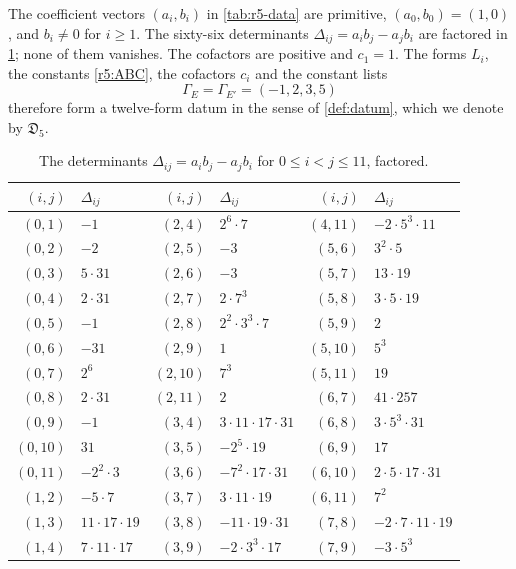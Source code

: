 \documentclass[12pt,oneside,openany]{book}
\theoremstyle{definition}
\theoremstyle{plain}
\numberwithin{equation}{chapter}
\theoremstyle{plain}
\theoremstyle{definition}
\theoremstyle{remark}
\newcommand{\datum}{\mathfrak D}
\begin{document}
The coefficient vectors $(a_i,b_i)$ in \cref{tab:r5-data} are primitive, $(a_0,b_0)=(1,0)$, and $b_i\ne0$ for $i\ge1$. The sixty-six determinants $\Delta_{ij}=a_ib_j-a_jb_i$ are factored in \cref{tab:r5-det}; none of them vanishes. The cofactors are positive and $c_1=1$. The forms $L_i$, the constants \eqref{r5:ABC}, the cofactors $c_i$ and the constant lists
\begin{equation}\label{r5:Gamma}
\Gamma_E=\Gamma_{E'}=(-1,2,3,5)
\end{equation}
therefore form a twelve-form datum in the sense of \cref{def:datum}, which we denote by $\datum_5$.

\begin{table}[htbp]
\centering
\caption{The determinants $\Delta_{ij}=a_ib_j-a_jb_i$ for $0\le i<j\le 11$, factored.}\label{tab:r5-det}
\small
\begin{tabular}{rl@{\qquad}rl@{\qquad}rl}
\toprule
$(i,j)$ & $\Delta_{ij}$ & $(i,j)$ & $\Delta_{ij}$ & $(i,j)$ & $\Delta_{ij}$\\
\midrule
$(0,1)$ & $-1$ & $(2,4)$ & $2^{6}\cdot 7$ & $(4,11)$ & $-2\cdot 5^{3}\cdot 11$ \\
$(0,2)$ & $-2$ & $(2,5)$ & $-3$ & $(5,6)$ & $3^{2}\cdot 5$ \\
$(0,3)$ & $5\cdot 31$ & $(2,6)$ & $-3$ & $(5,7)$ & $13\cdot 19$ \\
$(0,4)$ & $2\cdot 31$ & $(2,7)$ & $2\cdot 7^{3}$ & $(5,8)$ & $3\cdot 5\cdot 19$ \\
$(0,5)$ & $-1$ & $(2,8)$ & $2^{2}\cdot 3^{3}\cdot 7$ & $(5,9)$ & $2$ \\
$(0,6)$ & $-31$ & $(2,9)$ & $1$ & $(5,10)$ & $5^{3}$ \\
$(0,7)$ & $2^{6}$ & $(2,10)$ & $7^{3}$ & $(5,11)$ & $19$ \\
$(0,8)$ & $2\cdot 31$ & $(2,11)$ & $2$ & $(6,7)$ & $41\cdot 257$ \\
$(0,9)$ & $-1$ & $(3,4)$ & $3\cdot 11\cdot 17\cdot 31$ & $(6,8)$ & $3\cdot 5^{3}\cdot 31$ \\
$(0,10)$ & $31$ & $(3,5)$ & $-2^{5}\cdot 19$ & $(6,9)$ & $17$ \\
$(0,11)$ & $-2^{2}\cdot 3$ & $(3,6)$ & $-7^{2}\cdot 17\cdot 31$ & $(6,10)$ & $2\cdot 5\cdot 17\cdot 31$ \\
$(1,2)$ & $-5\cdot 7$ & $(3,7)$ & $3\cdot 11\cdot 19$ & $(6,11)$ & $7^{2}$ \\
$(1,3)$ & $11\cdot 17\cdot 19$ & $(3,8)$ & $-11\cdot 19\cdot 31$ & $(7,8)$ & $-2\cdot 7\cdot 11\cdot 19$ \\
$(1,4)$ & $7\cdot 11\cdot 17$ & $(3,9)$ & $-2\cdot 3^{3}\cdot 17$ & $(7,9)$ & $-3\cdot 5^{3}$ \\

\end{tabular}
\end{table}
\end{document}
